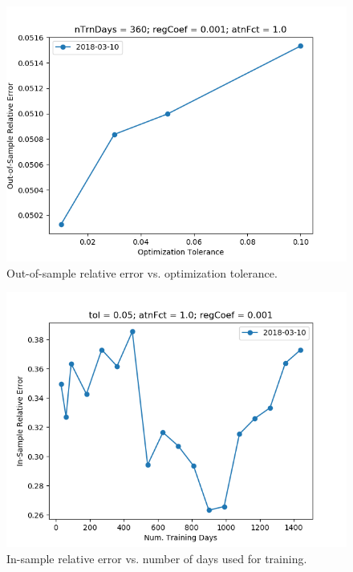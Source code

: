 \documentclass{article}
\begin{document}
\begin{figure}\label{fig:tolerance-sensitivity-oos-error}
\includegraphics[width = \textwidth]{figures/tolerance-sensitivity-oos-error.png}
\caption{Out-of-sample relative error vs. optimization tolerance.}
\end{figure}

\begin{figure}\label{fig:nTrnDays-sensitivity-error}
\includegraphics[width = \textwidth]{figures/nTrnDays-sensitivity-error.png}
\caption{In-sample relative error vs. number of days used for training.}
\end{figure}
\end{document}
